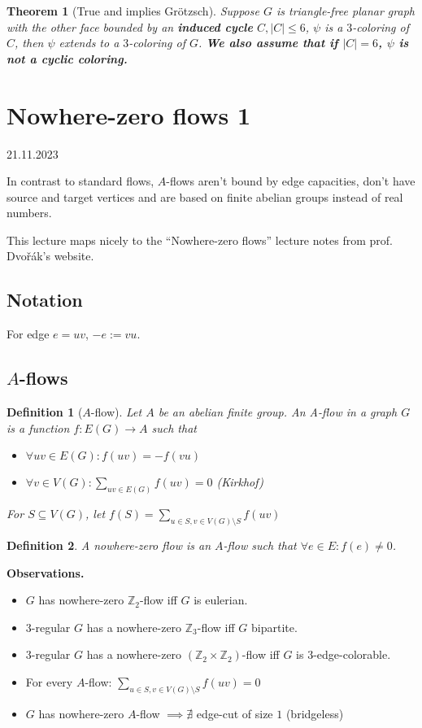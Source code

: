 \documentclass{article}
\newtheorem*{theorem}{Theorem}
\newtheorem*{definition}{Definition}
\newcommand{\Z}{\mathbb{Z}}
\begin{document}
\begin{theorem}[True and implies Grötzsch]
	Suppose $G$ is triangle-free planar graph with the other face bounded
	by an \textbf{induced cycle} $C, |C| \le 6$, $\psi$ is a $3$-coloring
	of $C$, then $\psi$ extends to a $3$-coloring of $G$.
	\textbf{We also assume that if $|C| = 6$, $\psi$ is not a cyclic
	coloring.}
\end{theorem}


\newpage
\section{Nowhere-zero flows 1} %
21.11.2023

\noindent
In contrast to standard flows, $A$-flows aren't bound by edge capacities, don't
have source and target vertices and are based on finite abelian groups instead
of real numbers.

This lecture maps nicely to the \enquote{Nowhere-zero flows} lecture notes from
prof. Dvořák's website.

\subsection*{Notation}
For edge $e = uv$, $-e := vu$.

\subsection*{$A$-flows}

\begin{definition}[$A$-flow]
	Let $A$ be an abelian finite group. An \emph{A-flow} in a graph $G$ is
	a function $f: E(G) \rightarrow A$ such that
	\begin{itemize}
		\item $\forall uv \in E(G): f(uv) = -f(vu)$
		\item $\forall v \in V(G): \sum_{uv \in E(G)}{f(uv)} = 0$
			(Kirkhof)
	\end{itemize}
	For $S \subseteq V(G)$, let $f(S) = \sum_{u \in S, v \in V(G) \setminus
	S}{f(uv)}$
\end{definition}

\begin{definition}
	A \emph{nowhere-zero flow} is an $A$-flow such that $\forall e \in E:
	f(e) \neq 0$.
\end{definition}

\noindent
\textbf{Observations.}
\begin{itemize}
	\item $G$ has nowhere-zero $\Z_2$-flow iff $G$ is eulerian.
	\item $3$-regular $G$ has a nowhere-zero $\Z_3$-flow iff $G$
		bipartite.
	\item $3$-regular $G$ has a nowhere-zero $(\Z_2 \times \Z_2)$-flow iff
		$G$ is $3$-edge-colorable.
	\item For every $A$-flow: $\sum_{u \in S, v \in V(G) \setminus S}f(uv)
		= 0$
	\item $G$ has nowhere-zero $A$-flow $\implies \nexists$ edge-cut of
		size $1$ (bridgeless)
\end{itemize}
\end{document}
